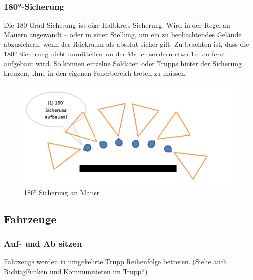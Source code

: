\subsubsection{180°-Sicherung}
Die 180-Grad-Sicherung ist eine Halbkreis-Sicherung. Wird in der Regel an Mauern angewandt – oder in einer Stellung, um ein zu beobachtendes Gelände abzusichern, wenn der Rückraum als absolut sicher gilt. Zu beachten ist, dass die 180° Sicherung nicht unmittelbar an der Mauer sondern etwa 1m entfernt aufgebaut wird. So können einzelne Soldaten oder Trupps hinter der Sicherung kreuzen, ohne in den eigenen Feuerbereich treten zu müssen. \\
\begin{figure}[htbp]
	\centering
	\includegraphics[width=15cm]{./Grafiken/Abschnitt/180er.png}
	\caption{180° Sicherung an Mauer}
\end{figure}
\subsection{Fahrzeuge}
\subsubsection{Auf- und Ab sitzen}
Fahrzeuge werden in umgekehrte Trupp Reihenfolge betreten. (Siehe auch \glqq Richtig\grqq Funken und Kommunizieren im Trupp“) \\
